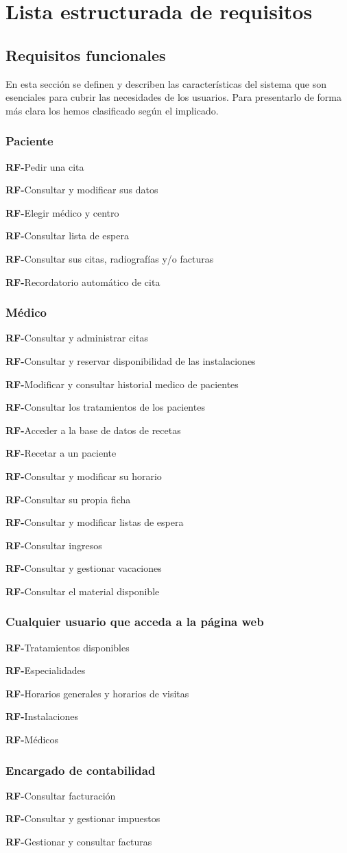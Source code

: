 \documentclass[12pt,a4paper]{article}
\newcounter{RFCounter}
\newcommand{\rf}[1]{\addtocounter{RFCounter}{1}\textbf{\rmfamily RF-\theRFCounter}\quad#1\\}
\begin{document}



\section{Lista estructurada de requisitos} %
\label{sec:lista_estructurada_de_requisitos}

\subsection{Requisitos funcionales}
En esta sección se definen y describen las características del sistema que son esenciales para cubrir las necesidades de los usuarios. Para presentarlo de forma más clara los hemos clasificado según el implicado.

\subsubsection{Paciente}
    \rf{Pedir una cita}
    \rf{Consultar y modificar sus datos}
    \rf{Elegir médico y centro}
    \rf{Consultar lista de espera}
    \rf{Consultar sus citas, radiografías y/o facturas}
    \rf{Recordatorio automático de cita}
\subsubsection{Médico}
    \rf{Consultar y administrar citas}
    \rf{Consultar y reservar disponibilidad de las instalaciones}
    \rf{Modificar y consultar historial medico de pacientes}
    \rf{Consultar los tratamientos de los pacientes}
    \rf{Acceder a la base de datos de recetas}
    \rf{Recetar a un paciente}
    \rf{Consultar y modificar su horario}
    \rf{Consultar su propia ficha}
    \rf{Consultar y modificar listas de espera    }
    \rf{Consultar ingresos}
    \rf{Consultar y gestionar vacaciones}
    \rf{Consultar el material disponible}
\subsubsection{Cualquier usuario que acceda a la página web}
    \rf{Tratamientos disponibles}
    \rf{Especialidades}
    \rf{Horarios generales y horarios de visitas}
    \rf{Instalaciones}
    \rf{Médicos}
\subsubsection{Encargado de contabilidad}
    \rf{Consultar facturación}
    \rf{Consultar y gestionar impuestos}
    \rf{Gestionar y consultar facturas}
\end{document}
